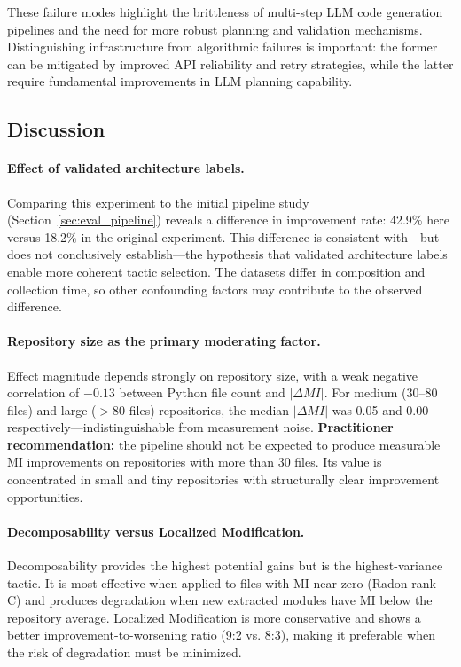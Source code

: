 \documentclass[sigconf,review,anonymous]{acmart}
\begin{document}
These failure modes highlight the brittleness of multi-step LLM code generation pipelines and the need for more robust planning and validation mechanisms. Distinguishing infrastructure from algorithmic failures is important: the former can be mitigated by improved API reliability and retry strategies, while the latter require fundamental improvements in LLM planning capability.

\subsection{Discussion}

\paragraph{Effect of validated architecture labels.} Comparing this experiment to the initial pipeline study (Section~\ref{sec:eval_pipeline}) reveals a difference in improvement rate: 42.9\% here versus 18.2\% in the original experiment. This difference is consistent with---but does not conclusively establish---the hypothesis that validated architecture labels enable more coherent tactic selection. The datasets differ in composition and collection time, so other confounding factors may contribute to the observed difference.

\paragraph{Repository size as the primary moderating factor.} Effect magnitude depends strongly on repository size, with a weak negative correlation of $-0.13$ between Python file count and $|\Delta MI|$. For medium (30--80 files) and large ($>$80 files) repositories, the median $|\Delta MI|$ was 0.05 and 0.00 respectively---indistinguishable from measurement noise. \textbf{Practitioner recommendation:} the pipeline should not be expected to produce measurable MI improvements on repositories with more than 30 files. Its value is concentrated in small and tiny repositories with structurally clear improvement opportunities.

\paragraph{Decomposability versus Localized Modification.} Decomposability provides the highest potential gains but is the highest-variance tactic. It is most effective when applied to files with MI near zero (Radon rank C) and produces degradation when new extracted modules have MI below the repository average. Localized Modification is more conservative and shows a better improvement-to-worsening ratio (9:2 vs. 8:3), making it preferable when the risk of degradation must be minimized.
\end{document}
